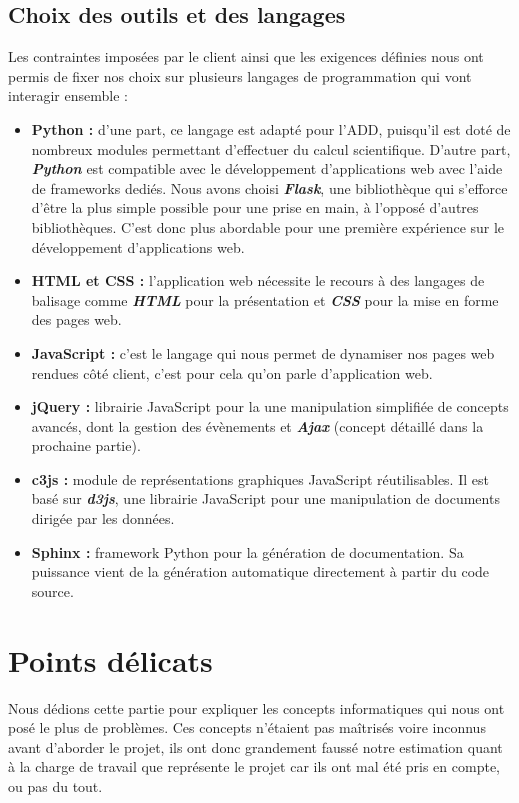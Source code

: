 		\subsection{Choix des outils et des langages}
		Les contraintes imposées par le client ainsi que les exigences définies nous ont permis de fixer nos choix sur plusieurs langages de programmation qui vont interagir ensemble : 
		\begin{itemize}[leftmargin=*]
			\item \textbf{Python :} d'une part, ce langage est adapté pour l'ADD, puisqu'il est doté de nombreux modules permettant d'effectuer du calcul scientifique. D'autre part, \textbf{\textit{Python}} est compatible avec le développement d’applications web avec l'aide de frameworks dediés. Nous avons choisi \textbf{\textit{Flask}}, une bibliothèque qui s’efforce d’être la plus simple possible pour une prise en main, à l'opposé d'autres bibliothèques. C'est donc plus abordable pour une première expérience sur le développement d'applications web.
			\item \textbf{HTML et CSS :} l'application web nécessite le recours à des langages de balisage comme \textbf{\textit{HTML}} pour la présentation et \textbf{\textit{CSS}} pour la mise en forme des pages web.
			\item \textbf{JavaScript :} c'est le langage qui nous permet de dynamiser nos pages web rendues côté client, c'est pour cela qu'on parle d'application web.
			\item \textbf{jQuery :} librairie JavaScript pour la une manipulation simplifiée de concepts avancés, dont la gestion des évènements et \textbf{\textit{Ajax}} (concept détaillé dans la prochaine partie).
			\item \textbf{c3js :} module de représentations graphiques JavaScript réutilisables. Il est basé sur \textbf{\textit{d3js}}, une librairie JavaScript pour une manipulation de documents dirigée par les données.
			\item \textbf{Sphinx :} framework Python pour la génération de documentation. Sa puissance vient de la génération automatique directement à partir du code source.
		\end{itemize}
		
	\section{Points délicats}
	Nous dédions cette partie pour expliquer les concepts informatiques qui nous ont posé le plus de problèmes. Ces concepts n'étaient pas maîtrisés voire inconnus avant d'aborder le projet, ils ont donc grandement faussé notre estimation quant à la charge de travail que représente le projet car ils ont mal été pris en compte, ou pas du tout.
	
